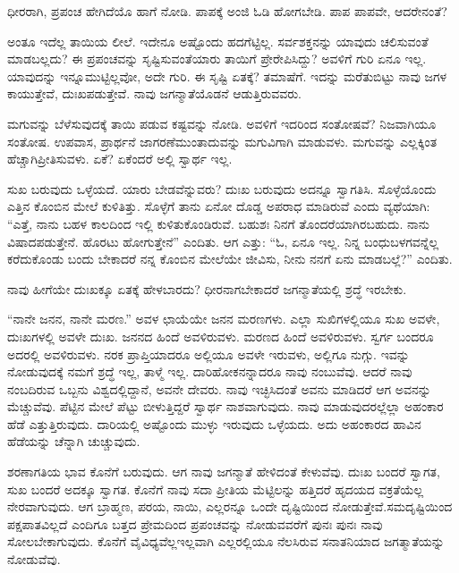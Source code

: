 ಧೀರರಾಗಿ, ಪ್ರಪಂಚ ಹೇಗಿದೆಯೊ ಹಾಗೆ ನೋಡಿ. ಪಾಪಕ್ಕೆ ಅಂಜಿ ಓಡಿ ಹೋಗಬೇಡಿ. ಪಾಪ ಪಾಪವೇ, ಆದರೇನಂತೆ?

ಅಂತೂ ಇದೆಲ್ಲ ತಾಯಿಯ ಲೀಲೆ. ಇದೇನೂ ಅಷ್ಟೊಂದು ಹದಗೆಟ್ಟಿಲ್ಲ. ಸರ್ವಶಕ್ತನನ್ನು ಯಾವುದು ಚಲಿಸುವಂತೆ ಮಾಡಬಲ್ಲದು? ಈ ಪ್ರಪಂಚವನ್ನು ಸೃಷ್ಟಿಸುವಂತೆ\break ಯಾರು ತಾಯಿಗೆ ಪ್ರೇರೇಪಿಸಿದ್ದು? ಅವಳಿಗೆ ಗುರಿ ಏನೂ ಇಲ್ಲ. ಯಾವುದನ್ನು ಇನ್ನೂ\break ಮುಟ್ಟಿಲ್ಲವೋ, ಅದೇ ಗುರಿ. ಈ ಸೃಷ್ಟಿ ಏತಕ್ಕೆ? ತಮಾಷೆಗೆ. ಇದನ್ನು ಮರೆತುಬಿಟ್ಟು ನಾವು ಜಗಳ ಕಾಯುತ್ತೇವೆ, ದುಃಖಪಡುತ್ತೇವೆ. ನಾವು ಜಗನ್ಮಾತೆಯೊಡನೆ ಆಡುತ್ತಿರುವವರು.

ಮಗುವನ್ನು ಬೆಳೆಸುವುದಕ್ಕೆ ತಾಯಿ ಪಡುವ ಕಷ್ಟವನ್ನು ನೋಡಿ. ಅವಳಿಗೆ ಇದರಿಂದ ಸಂತೋಷವೆ? ನಿಜವಾಗಿಯೂ ಸಂತೋಷ. ಉಪವಾಸ, ಪ್ರಾರ್ಥನೆ ಜಾಗರಣೆ\break ಮುಂತಾದುವನ್ನು ಮಗುವಿಗಾಗಿ ಮಾಡುವಳು. ಮಗುವನ್ನು ಎಲ್ಲಕ್ಕಿಂತ ಹೆಚ್ಚಾಗಿ\break ಪ್ರೀತಿಸುವಳು. ಏಕೆ? ಏಕೆಂದರೆ ಅಲ್ಲಿ ಸ್ವಾರ್ಥ ಇಲ್ಲ.

ಸುಖ ಬರುವುದು ಒಳ್ಳೆಯದೆ. ಯಾರು ಬೇಡವೆನ್ನುವರು? ದುಃಖ ಬರುವುದು ಅದನ್ನೂ ಸ್ವಾಗತಿಸಿ. ಸೊಳ್ಳೆಯೊಂದು ಎತ್ತಿನ ಕೊಂಬಿನ ಮೇಲೆ ಕುಳಿತಿತ್ತು. ಸೊಳ್ಳೆಗೆ ತಾನು ಏನೋ ದೊಡ್ಡ ಅಪರಾಧ ಮಾಡಿರುವೆ ಎಂದು ವ್ಯಥೆಯಾಗಿ: “ಎತ್ತೆ, ನಾನು ಬಹಳ ಕಾಲದಿಂದ ಇಲ್ಲಿ ಕುಳಿತುಕೊಂಡಿರುವೆ. ಬಹುಶಃ ನಿನಗೆ ತೊಂದರೆಯಾಗಿರಬಹುದು. ನಾನು ವಿಷಾದಪಡುತ್ತೇನೆ. ಹೊರಟು ಹೋಗುತ್ತೇನೆ” ಎಂದಿತು. ಆಗ ಎತ್ತು: “ಓ, ಏನೂ ಇಲ್ಲ. ನಿನ್ನ ಬಂಧುಬಳಗವನ್ನೆಲ್ಲ ಕರೆದುಕೊಂಡು ಬಂದು ಬೇಕಾದರೆ ನನ್ನ ಕೊಂಬಿನ ಮೇಲೆಯೇ ಜೀವಿಸು, ನೀನು ನನಗೆ ಏನು ಮಾಡಬಲ್ಲೆ?” ಎಂದಿತು.

ನಾವು ಹೀಗೆಯೇ ದುಃಖಕ್ಕೂ ಏತಕ್ಕೆ ಹೇಳಬಾರದು? ಧೀರನಾಗಬೇಕಾದರೆ ಜಗನ್ಮಾತೆಯಲ್ಲಿ ಶ್ರದ್ಧೆ ಇರಬೇಕು.

“ನಾನೇ ಜನನ, ನಾನೇ ಮರಣ.” ಅವಳ ಛಾಯೆಯೇ ಜನನ ಮರಣಗಳು. ಎಲ್ಲಾ ಸುಖಿಗಳಲ್ಲಿಯೂ ಸುಖ ಅವಳೇ, ದುಃಖಗಳಲ್ಲಿ ಅವಳೇ ದುಃಖ. ಜನನದ ಹಿಂದೆ ಅವಳಿರುವಳು. ಮರಣದ ಹಿಂದೆ ಅವಳಿರುವಳು. ಸ್ವರ್ಗ ಬಂದರೂ ಅದರಲ್ಲಿ ಅವಳಿರುವಳು. ನರಕ ಪ್ರಾಪ್ತಿಯಾದರೂ ಅಲ್ಲಿಯೂ ಅವಳೇ ಇರುವಳು, ಅಲ್ಲಿಗೂ ನುಗ್ಗು. ಇವನ್ನು ನೋಡುವುದಕ್ಕೆ ನಮಗೆ ಶ್ರದ್ಧೆ ಇಲ್ಲ, ತಾಳ್ಮೆ ಇಲ್ಲ. ದಾರಿಹೋಕನನ್ನಾದರೂ ನಾವು ನಂಬುವೆವು. ಆದರೆ ನಾವು ನಂಬದಿರುವ ಒಬ್ಬನು ವಿಶ್ವದಲ್ಲಿದ್ದಾನೆ, ಅವನೇ ದೇವರು. ನಾವು ಇಚ್ಛಿಸಿದಂತೆ ಅವನು ಮಾಡಿದರೆ ಆಗ ಅವನನ್ನು ಮೆಚ್ಚುವೆವು. ಪೆಟ್ಟಿನ ಮೇಲೆ ಪೆಟ್ಟು ಬೀಳುತ್ತಿದ್ದರೆ ಸ್ವಾರ್ಥ ನಾಶವಾಗುವುದು. ನಾವು ಮಾಡುವುದರಲ್ಲೆಲ್ಲಾ ಅಹಂಕಾರ ಹೆಡೆ ಎತ್ತುತ್ತಿರುವುದು. ದಾರಿಯಲ್ಲಿ ಅಷ್ಟೊಂದು ಮುಳ್ಳು ಇರುವುದು ಒಳ್ಳೆಯದು. ಅದು ಅಹಂಕಾರದ ಹಾವಿನ ಹೆಡೆಯನ್ನು ಚೆನ್ನಾಗಿ ಚುಚ್ಚುವುದು.

ಶರಣಾಗತಿಯ ಭಾವ ಕೊನೆಗೆ ಬರುವುದು. ಆಗ ನಾವು ಜಗನ್ಮಾತೆ ಹೇಳಿದಂತೆ ಕೇಳುವೆವು. ದುಃಖ ಬಂದರೆ ಸ್ವಾಗತ, ಸುಖ ಬಂದರೆ ಅದಕ್ಕೂ ಸ್ವಾಗತ. ಕೊನೆಗೆ ನಾವು ಸದಾ ಪ್ರೀತಿಯ ಮೆಟ್ಟಿಲನ್ನು ಹತ್ತಿದರೆ ಹೃದಯದ ವಕ್ರತೆಯೆಲ್ಲ ನೇರವಾಗುವುದು. ಆಗ ಬ್ರಾಹ್ಮಣ, ಪರಯ, ನಾಯಿ, ಎಲ್ಲರನ್ನೂ ಒಂದೇ ದೃಷ್ಟಿಯಿಂದ ನೋಡುತ್ತೇವೆ.\break ಸಮದೃಷ್ಟಿಯಿಂದ ಪಕ್ಷಪಾತವಿಲ್ಲದೆ ಎಂದಿಗೂ ಬತ್ತದ ಪ್ರೇಮದಿಂದ ಪ್ರಪಂಚವನ್ನು ನೋಡುವವರೆಗೆ ಪುನಃ ಪುನಃ ನಾವು ಸೋಲಬೇಕಾಗುವುದು. ಕೊನೆಗೆ ವೈವಿಧ್ಯವೆಲ್ಲ\break ಇಲ್ಲವಾಗಿ ಎಲ್ಲರಲ್ಲಿಯೂ ನೆಲಸಿರುವ ಸನಾತನಿಯಾದ ಜಗತ್ಮಾತೆಯನ್ನು ನೋಡುವೆವು.

